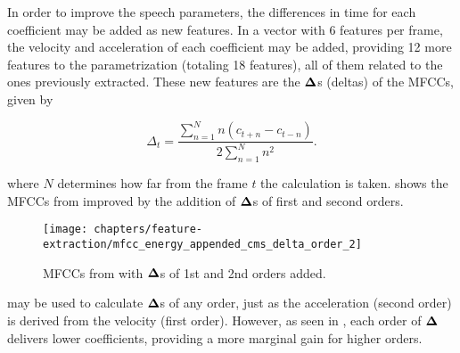 
In order to improve the speech parameters, the differences in time for each coefficient may be added as new features. In a vector with 6 features per frame, the velocity and acceleration of each coefficient may be added, providing 12 more features to the parametrization (totaling 18 features), all of them related to the ones previously extracted. These new features are the $\boldsymbol{\Delta}$s (deltas) of the MFCCs, given by

\begin{equation}
    \Delta_t = \frac{\sum_{n=1}^N n(c_{t+n} - c_{t-n})}{2\sum_{n=1}^N n^2}.
    \label{eq:deltas}
\end{equation}

\noindent where $N$ determines how far from the frame $t$ the calculation is taken.  shows the MFCCs from  improved by the addition of $\boldsymbol{\Delta}$s of first and second orders.

\begin{figure}[ht]
    \centering
    \texttt{[image: chapters/feature-extraction/mfcc\_energy\_appended\_cms\_delta\_order\_2]}
    \caption{MFCCs from  with $\boldsymbol{\Delta}$s of 1st and 2nd orders added.}
    \label{fig:mfcc_energy_appended_cms_delta_order_2}
\end{figure}

 may be used to calculate $\boldsymbol{\Delta}$s of any order, just as the acceleration (second order) is derived from the velocity (first order). However, as seen in , each order of $\boldsymbol{\Delta}$ delivers lower coefficients, providing a more marginal gain for higher orders.